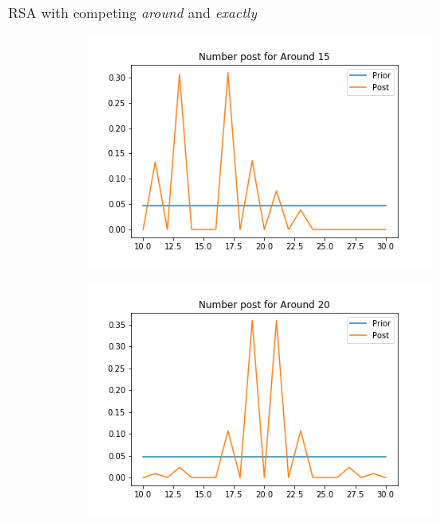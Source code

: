 \documentclass[xcolor=table, hyperref={pdfpagelabels=false}]{beamer}
\begin{document}
\begin{frame}{RSA with competing \textit{around} and \textit{exactly}}
\begin{minipage}{.4\textwidth}
	\begin{figure}[H]
	\centering
	\begin{subfigure}[b]{.8\textwidth}
		\includegraphics[width=\textwidth]{./images/number_post_around_15_exactly.png}
	\end{subfigure}
	\begin{subfigure}[b]{.8\textwidth}
		\includegraphics[width=\textwidth]{./images/number_post_around_20_exactly.png}
	\end{subfigure}
	\begin{subfigure}[b]{.8\textwidth}

\end{subfigure}
\end{figure}
\end{minipage}
\end{frame}
\end{document}
